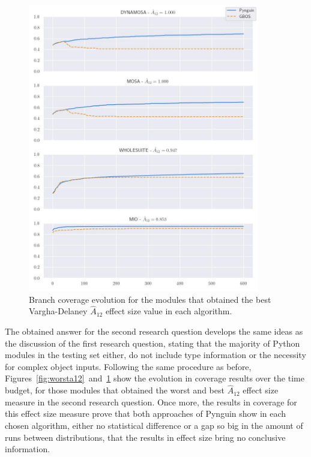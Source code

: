 \documentclass[%
  chapterprefix=false,%
  open=right,%
  twoside=true,%
  paper=a4,%
  logofile={Figures/logo.png},%
  thesistype=master,%
  UKenglish,%
]{se2thesis}
\begin{document}
\begin{figure}[ptbh]
  \centering
  \includegraphics[width=0.9\textwidth]{Figures/Results/bestA12.jpg}
  \caption{Branch coverage evolution for the modules that obtained the best Vargha-Delaney \(\hat{A}_{12}\) effect size value in each algorithm.}\label{fig:besta12}
\end{figure}

The obtained answer for the second research question develops the same ideas as the discussion of the first research question, stating that the majority of Python modules in the testing set either, do not include type information or the necessity for complex object inputs.
Following the same procedure as before, Figures~\ref{fig:worsta12}~and~\ref{fig:besta12} show the evolution in coverage results over the time budget, for those modules that obtained the worst  and best \(\hat{A}_{12}\) effect size measure in the second research question.
Once more, the results in coverage for this effect size measure prove that both approaches of Pynguin show in each chosen algorithm, either no statistical difference or a gap so big in the amount of runs between distributions, that the results in effect size bring no conclusive information.
\end{document}
